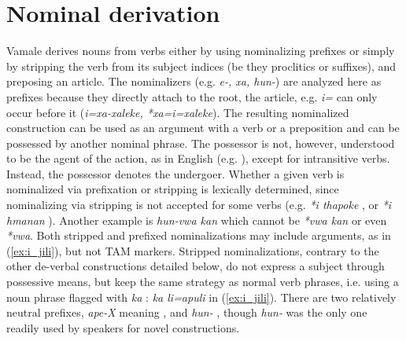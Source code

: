 \section{Nominal derivation}
\label{sec:NomDeriv}

Vamale derives nouns from verbs either by using nominalizing prefixes or simply by stripping the verb from its subject indices (be they proclitics or suffixes), and preposing an article. The nominalizers (e.g. \textit{e-, xa, hun-}) are analyzed here as prefixes because they directly attach to the root, the article, e.g. \textit{i=}  can only occur before it (\textit{i=xa-xaleke, *xa=i=xaleke}). 
The resulting nominalized construction can be used as an argument with a verb or a preposition and can be possessed by another nominal phrase. The possessor is not, however, understood to be the agent of the action, as in English (e.g. ), except for intransitive verbs. Instead, the possessor denotes the undergoer. %
Whether a given verb is nominalized via prefixation or stripping is lexically determined, since nominalizing via stripping is not accepted for some verbs (e.g. \textit{*i thapoke} , or \textit{*i hmanan} ). Another example is \textit{hun-vwa kan}  which cannot be \textit{*vwa kan} or even \textit{*vwa}. Both stripped and prefixed nominalizations may include arguments, as in (\ref{ex:i_jili}), but not TAM markers. 
Stripped nominalizations, contrary to the other de-verbal constructions detailed below, do not express a subject through possessive means, but keep the same strategy as normal verb phrases, i.e. using a noun phrase flagged with \textit{ka} : \textit{ka li=apuli}  in (\ref{ex:i_jili}). There are two relatively neutral prefixes, \textit{ape-X} meaning , and \textit{hun-} , though \textit{hun-} was the only one readily used by speakers for novel constructions. 

